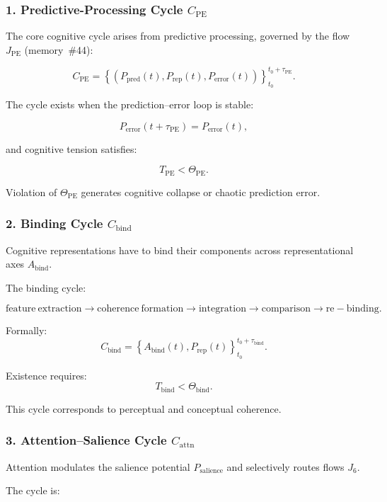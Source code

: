 \subsubsection{1. Predictive-Processing Cycle $C_{\mathrm{PE}}$}

The core cognitive cycle arises from predictive processing, governed by
the flow $J_{\mathrm{PE}}$ (memory~\#44):

\[
 C_{\mathrm{PE}} = 
 \left\{
   (P_{\mathrm{pred}}(t),
    P_{\mathrm{rep}}(t),
    P_{\mathrm{error}}(t))
 \right\}_{t_0}^{t_0+\tau_{\mathrm{PE}}}.
\]

The cycle exists when the prediction–error loop is stable:

\[
 P_{\mathrm{error}}(t+\tau_{\mathrm{PE}}) = P_{\mathrm{error}}(t),
\]

and cognitive tension satisfies:

\[
 T_{\mathrm{PE}} < \Theta_{\mathrm{PE}}.
\]

Violation of $\Theta_{\mathrm{PE}}$ generates cognitive collapse or chaotic
prediction error.

\subsubsection{2. Binding Cycle $C_{\mathrm{bind}}$}

Cognitive representations have to bind their components across
representational axes $A_{\mathrm{bind}}$.

The binding cycle:

\[
 \mathrm{feature\ extraction}
 \to
 \mathrm{coherence\ formation}
 \to
 \mathrm{integration}
 \to
 \mathrm{comparison}
 \to
 \mathrm{re-binding}.
\]

Formally:
\[
 C_{\mathrm{bind}} =
 \left\{
   A_{\mathrm{bind}}(t), P_{\mathrm{rep}}(t)
 \right\}_{t_0}^{t_0+\tau_{\mathrm{bind}}}.
\]

Existence requires:
\[
 T_{\mathrm{bind}} < \Theta_{\mathrm{bind}}.
\]

This cycle corresponds to perceptual and conceptual coherence.

\subsubsection{3. Attention–Salience Cycle $C_{\mathrm{attn}}$}

Attention modulates the salience potential $P_{\mathrm{salience}}$ and
selectively routes flows $J_6$.

The cycle is:

